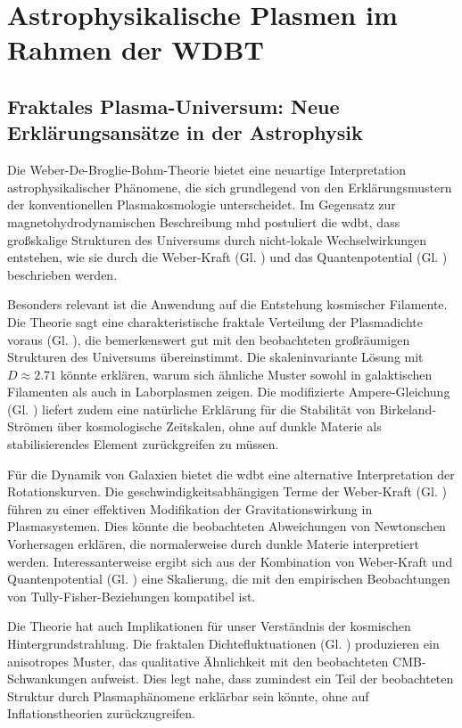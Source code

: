 \chapter{Astrophysikalische Plasmen im Rahmen der WDBT}
\section{Fraktales Plasma-Universum: Neue Erklärungsansätze in der Astrophysik}
Die Weber-De-Broglie-Bohm-Theorie bietet eine neuartige Interpretation astrophysikalischer Phänomene, die sich grundlegend von den Erklärungsmustern der konventionellen
Plasmakosmologie unterscheidet. Im Gegensatz zur magnetohydrodynamischen Beschreibung \gls{mhd} postuliert die \gls{wdbt}, dass großskalige Strukturen des Universums durch nicht-lokale
Wechselwirkungen entstehen, wie sie durch die Weber-Kraft (Gl. ) und das Quantenpotential (Gl. ) beschrieben werden.

Besonders relevant ist die Anwendung auf die Entstehung kosmischer Filamente. Die Theorie sagt eine charakteristische fraktale Verteilung der Plasmadichte voraus (Gl. ), die
bemerkenswert gut mit den beobachteten großräumigen Strukturen des Universums übereinstimmt. Die skaleninvariante Lösung mit $D \approx 2.71$ könnte erklären, warum sich ähnliche
Muster sowohl in galaktischen Filamenten als auch in Laborplasmen zeigen. Die modifizierte Ampere-Gleichung (Gl. ) liefert zudem eine natürliche Erklärung für die Stabilität
von Birkeland-Strömen über kosmologische Zeitskalen, ohne auf dunkle Materie als stabilisierendes Element zurückgreifen zu müssen.

Für die Dynamik von Galaxien bietet die \gls{wdbt} eine alternative Interpretation der Rotationskurven. Die geschwindigkeitsabhängigen Terme der Weber-Kraft (Gl. ) führen zu
einer effektiven Modifikation der Gravitationswirkung in Plasmasystemen. Dies könnte die beobachteten Abweichungen von Newtonschen Vorhersagen erklären, die normalerweise durch
dunkle Materie interpretiert werden. Interessanterweise ergibt sich aus der Kombination von Weber-Kraft und Quantenpotential (Gl. ) eine Skalierung, die mit den empirischen
Beobachtungen von Tully-Fisher-Beziehungen kompatibel ist.

Die Theorie hat auch Implikationen für unser Verständnis der kosmischen Hintergrundstrahlung. Die fraktalen Dichtefluktuationen (Gl. ) produzieren ein anisotropes Muster, das
qualitative Ähnlichkeit mit den beobachteten CMB-Schwankungen aufweist. Dies legt nahe, dass zumindest ein Teil der beobachteten Struktur durch Plasmaphänomene erklärbar sein
könnte, ohne auf Inflationstheorien zurückzugreifen.

